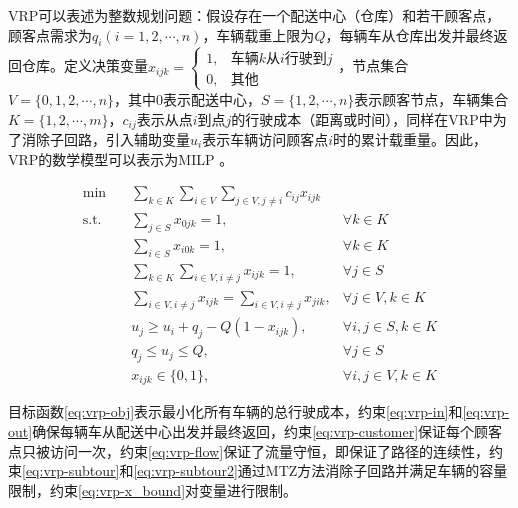 \documentclass[fontset=none]{ctexart}
\begin{document}
VRP可以表述为整数规划问题\cite{2014Vehicle}：假设存在一个配送中心（仓库）和若干顾客点，顾客点需求为$q_i(i = 1,2,\cdots,n)$，车辆载重上限为$Q$，每辆车从仓库出发并最终返回仓库。定义决策变量$x_{ijk} = \begin{cases}1, & \text{车辆$k$从$i$行驶到$j$}\\0, & \text{其他} \end{cases}$，节点集合$V = \{0, 1, 2, \cdots, n\}$，其中0表示配送中心，$S = \{1,2,\cdots,n\}$表示顾客节点，车辆集合$K = \{1,2,\cdots,m\}$，$c_{ij}$表示从点$i$到点$j$的行驶成本（距离或时间），同样在VRP中为了消除子回路，引入辅助变量$u_i$表示车辆访问顾客点$i$时的累计载重量。因此，VRP的数学模型可以表示为MILP 。

\begin{theorem}
\begin{align}
    \min \quad & \sum_{k \in K}\sum_{i \in V}\sum_{j \in V, j \neq i} c_{ij}x_{ijk} & \label{eq:vrp-obj}\\
    \text{s.t.} \quad & \sum_{j \in S} x_{0jk} = 1, & \forall k \in K\label{eq:vrp-in}\\
    \quad & \sum_{i \in S} x_{i0k} = 1, & \forall k \in K\label{eq:vrp-out}\\
    \quad & \sum_{k \in K}\sum_{i \in V, i \neq j} x_{ijk} = 1, & \forall j \in S\label{eq:vrp-customer}\\
    \quad & \sum_{i \in V, i \neq j}x_{ijk} = \sum_{i \in V, i \neq j} x_{jik}, & \forall j \in V, k \in K\label{eq:vrp-flow}\\
    \quad & u_j \geq u_i + q_j -Q(1 - x_{ijk}), & \forall i, j \in S, k \in K\label{eq:vrp-subtour}\\
    \quad & q_j \leq u_j \leq Q, & \forall j \in S\label{eq:vrp-subtour2}\\
    \quad & x_{ijk} \in \{0, 1\}, & \forall i, j \in V, k \in K\label{eq:vrp-x_bound}
\end{align}

目标函数\eqref{eq:vrp-obj}表示最小化所有车辆的总行驶成本，约束\eqref{eq:vrp-in}和\eqref{eq:vrp-out}确保每辆车从配送中心出发并最终返回，约束\eqref{eq:vrp-customer}保证每个顾客点只被访问一次，约束\eqref{eq:vrp-flow}保证了流量守恒，即保证了路径的连续性，约束\eqref{eq:vrp-subtour}和\eqref{eq:vrp-subtour2}通过MTZ方法消除子回路并满足车辆的容量限制，约束\eqref{eq:vrp-x_bound}对变量进行限制。
\end{theorem}


\end{document}
